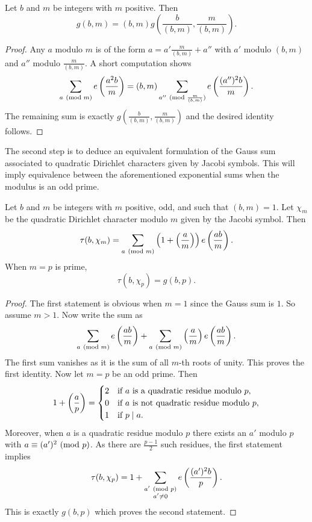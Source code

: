     \begin{proposition}\label{prop:quadratic_Gauss_sum_relatively_prime_reduction}
      Let \(b\) and \(m\) be integers with \(m\) positive. Then
      \[
        g(b,m) = (b,m)g\left(\frac{b}{(b,m)},\frac{m}{(b,m)}\right).
      \]
    \end{proposition}
    \begin{proof}
      Any \(a\) modulo \(m\) is of the form \(a = a'\frac{m}{(b,m)}+a''\) with \(a'\) modulo \((b,m)\) and \(a''\) modulo \(\frac{m}{(b,m)}\). A short computation shows
      \[
        \sum_{a \ (\mathrm{mod}\text{ }m)}e\left(\frac{a^{2}b}{m}\right) = (b,m)\sum_{a'' \ (\mathrm{mod}\text{ }\frac{m}{(b,m)})}e\left(\frac{(a'')^{2}b}{m}\right).
      \]
      The remaining sum is exactly \(g\left(\frac{b}{(b,m)},\frac{m}{(b,m)}\right)\) and the desired identity follows.
    \end{proof}

    The second step is to deduce an equivalent formulation of the Gauss sum associated to quadratic Dirichlet characters given by Jacobi symbols. This will imply equivalence between the aforementioned exponential sums when the modulus is an odd prime.

    \begin{proposition}\label{prop:Gauss_sum_equivalence_for_primes}
      Let \(b\) and \(m\) be integers with \(m\) positive, odd, and such that \((b,m) = 1\). Let \(\chi_{m}\) be the quadratic Dirichlet character modulo \(m\) given by the Jacobi symbol. Then
      \[
        \tau(b,\chi_{m}) = \sum_{a \ (\mathrm{mod}\text{ }m)}\left(1+\left(\frac{a}{m}\right)\right)e\left(\frac{ab}{m}\right).
      \]
      When \(m = p\) is prime,
      \[
        \tau(b,\chi_{p}) = g(b,p).
      \]
    \end{proposition}
    \begin{proof}
      The first statement is obvious when \(m = 1\) since the Gauss sum is \(1\). So assume \(m > 1\). Now write the sum as
      \[
        \sum_{a \ (\mathrm{mod}\text{ }m)}e\left(\frac{ab}{m}\right)+\sum_{a \ (\mathrm{mod}\text{ }m)}\left(\frac{a}{m}\right)e\left(\frac{ab}{m}\right).
      \]
      The first sum vanishes as it is the sum of all \(m\)-th roots of unity. This proves the first identity. Now let \(m = p\) be an odd prime. Then
      \[
        1+\left(\frac{a}{p}\right) = \begin{cases} 2 & \text{if \(a\) is a quadratic residue modulo \(p\)}, \\ 0 & \text{if \(a\) is not quadratic residue modulo \(p\)}, \\ 1 & \text{if \(p \mid a\)}. \end{cases}
      \]
      Moreover, when \(a\) is a quadratic residue modulo \(p\) there exists an \(a'\) modulo \(p\) with \(a \equiv (a')^{2} \ (\mathrm{mod}\text{ }p)\). As there are \(\frac{p-1}{2}\) such residues, the first statement implies
      \[
        \tau(b,\chi_{p}) = 1+\sum_{\substack{a' \ (\mathrm{mod}\text{ }p) \\ a' \neq 0}}e\left(\frac{(a')^{2}b}{p}\right).
      \]
      This is exactly \(g(b,p)\) which proves the second statement.
    \end{proof}

